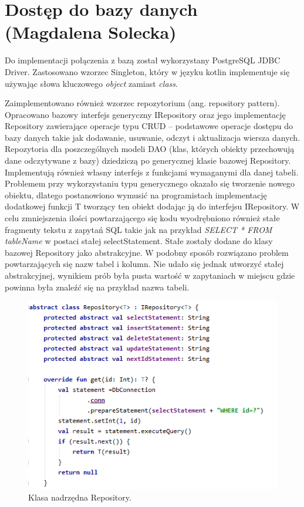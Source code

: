 \documentclass[10pt,twoside,a4paper]{report}
\begin{document}
\section{Dostęp do bazy danych (Magdalena Solecka)}
\par Do implementacji połączenia z bazą został wykorzystany PostgreSQL JDBC Driver\cite{JDBC}. Zastosowano wzorzec Singleton, który w języku kotlin implementuje się używając słowa kluczowego \textit{object} zamiast \textit{class}.
\par Zaimplementowano również wzorzec repozytorium (ang. repository pattern). Opracowano bazowy interfejs generyczny IRepository oraz jego implementację  Repository zawierające operacje typu CRUD -- podstawowe operacje dostępu do bazy danych takie jak dodawanie, usuwanie, odczyt i aktualizacja wiersza danych. Repozytoria dla poszczególnych modeli DAO (klas, których obiekty przechowują dane odczytywane z bazy) dziedziczą po generycznej klasie bazowej Repository. Implementują również własny interfejs z funkcjami wymaganymi dla danej tabeli. Problemem przy wykorzystaniu typu generycznego okazało się tworzenie nowego obiektu, dlatego postanowiono wymusić na programistach implementację dodatkowej funkcji T tworzący ten obiekt dodając ją do interfejsu IRepository. W celu zmniejszenia ilości powtarzającego się kodu wyodrębniono również stałe fragmenty tekstu z zapytań SQL takie jak na przykład \textit{SELECT * FROM tableName } w postaci stałej selectStatement. Stałe zostały dodane do klasy bazowej Repository jako abstrakcyjne. W podobny sposób rozwiązano problem powtarzających się nazw tabel i kolumn. Nie udało się jednak utworzyć stałej abstrakcyjnej, wynikiem prób była pusta wartość w zapytaniach w miejscu gdzie powinna była znaleźć się na przykład nazwa tabeli.

\noindent\newline
\begin{figure}[h]
\centering
\includegraphics[width=\linewidth]{repository}
\caption{Klasa nadrzędna Repository. }
\label{fig:repository}
\end{figure}
\FloatBarrier
\end{document}
